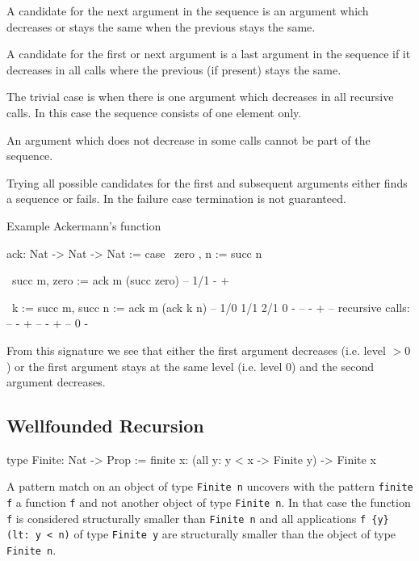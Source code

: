 A candidate for the next argument in the sequence is an argument which
decreases or stays the same when the previous stays the same.

A candidate for the first or next argument is a last argument in the
sequence if it decreases in all calls where the previous (if present) stays the
same.

The trivial case is when there is one argument which decreases in all recursive
calls. In this case the sequence consists of one element only.

An argument which does not decrease in some calls cannot be part of the
sequence.

Trying all possible candidates for the first and subsequent arguments either
finds a sequence or fails. In the failure case termination is not guaranteed.

\noindent Example Ackermann's function
\begin{alba}
    ack: Nat -> Nat -> Nat := case
        \ zero  ,      n      :=  succ n

        \ succ m,      zero   :=  ack m (succ zero)
    --         1/1                    -  +

        \ k := succ m, succ n :=  ack m (ack k n)
    --    1/0       1/1     2/1              0 -
    --                                -  +
    --  recursive calls:
    --     - +
    --     - +
    --     0 -
\end{alba}


From this signature we see that either the first argument decreases (i.e. level
$> 0$) or the first argument stays at the same level (i.e. level $0$) and the
second argument decreases.






\subsection{Wellfounded Recursion}

\begin{alba}
    type Finite: Nat -> Prop :=
        finite {x}: (all {y}: y < x -> Finite y) -> Finite x
\end{alba}

A pattern match on an object of type \lstinline!Finite n! uncovers with the
pattern \lstinline!finite f! a function \lstinline!f! and not another object of
type \lstinline!Finite n!. In that case the function \lstinline!f! is considered
structurally smaller than \lstinline!Finite n! and all applications
\lstinline!f {y} (lt: y < n)! of type \lstinline!Finite y! are structurally
smaller than the object of type \lstinline!Finite n!.

